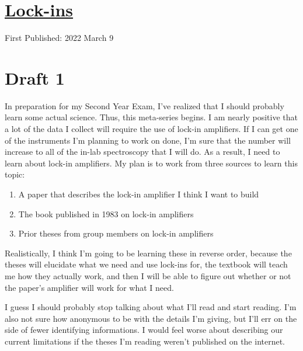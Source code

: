 \documentclass[12pt]{article}[titlepage]
\newcommand{\1}{\={a}}
\newcommand{\2}{\={e}}
\newcommand{\3}{\={\i}}
\newcommand{\4}{\=o}
\newcommand{\5}{\=u}
\newcommand{\6}{\={A}}
\renewcommand{\,}{\textsuperscript{,}}
\begin{document}
\doublespacing
\section{\href{lock-ins-0.html}{Lock-ins}}
First Published: 2022 March 9


\section{Draft 1}
In preparation for my Second Year Exam, I've realized that I should probably learn some actual science.
Thus, this meta-series begins.
I am nearly positive that a lot of the data I collect will require the use of lock-in amplifiers.
If I can get one of the instruments I'm planning to work on done, I'm sure that the number will increase to all of the in-lab spectroscopy that I will do.
As a result, I need to learn about lock-in amplifiers.
My plan is to work from three sources to learn this topic:
\begin{enumerate}
\item A paper that describes the lock-in amplifier I think I want to build
\item The book published in 1983 on lock-in amplifiers
\item Prior theses from group members on lock-in amplifiers
\end{enumerate}
Realistically, I think I'm going to be learning these in reverse order, because the theses will elucidate what we need and use lock-ins for, the textbook will teach me how they actually work, and then I will be able to figure out whether or not the paper's amplifier will work for what I need.

I guess I should probably stop talking about what I'll read and start reading.
I'm also not sure how anonymous to be with the details I'm giving, but I'll err on the side of fewer identifying informations.
I would feel worse about describing our current limitations if the theses I'm reading weren't published on the internet.
\end{document}
